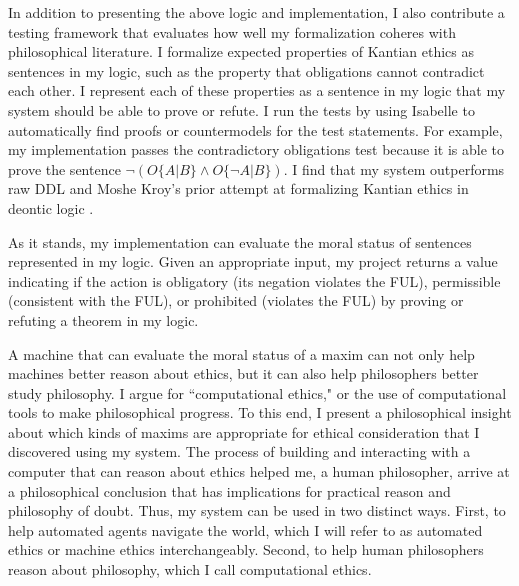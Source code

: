 \begin{isabellebody}
\begin{isamarkuptext}
In addition to presenting the above logic and implementation, I also contribute a testing framework 
that evaluates how well my formalization coheres with philosophical literature. I formalize expected 
properties of Kantian ethics as sentences in my logic, such as the property that obligations cannot 
contradict each other. I represent each of these properties as a sentence in my logic that my system 
should be able to prove or refute. I run the tests by using Isabelle to automatically find proofs or 
countermodels for the test statements. For example, my implementation passes the contradictory 
obligations test because it is able to prove the sentence $\neg (O\{A|B\} \wedge O\{\neg A | B\})$. 
I find that my system outperforms raw DDL and Moshe Kroy's prior attempt at formalizing Kantian ethics 
in deontic logic \citep{kroy}.

As it stands, my implementation can evaluate the moral status of sentences represented in my logic. 
Given an appropriate input, my project returns a value indicating if the action is obligatory 
(its negation violates the FUL), permissible (consistent with the FUL), or prohibited (violates the FUL) 
by proving or refuting a theorem in my logic. 

A machine that can evaluate the moral status of a maxim can not only help machines better reason about ethics, 
but it can also help philosophers 
better study philosophy. I argue for ``computational ethics," or the use of computational tools to 
make philosophical progress. To this end, I present a philosophical insight about which kinds of
maxims are appropriate for ethical consideration that I discovered using my system. 
The process of building and interacting with a computer that can reason about ethics helped me, a 
human philosopher, arrive at a philosophical conclusion that has implications for practical
reason and philosophy of doubt. Thus, my system can be used in two distinct ways. First, to help
automated agents navigate the world, which I will refer to as automated ethics or machine ethics interchangeably. Second, 
to help human philosophers reason about philosophy, which I call computational ethics.%
\end{isamarkuptext}\isamarkuptrue%
%
\isadelimtheory
%
\endisadelimtheory
%
\isatagtheory
%
\endisatagtheory
{\isafoldtheory}%
%
\isadelimtheory
%
\endisadelimtheory
%
\end{isabellebody}%
\endinput
